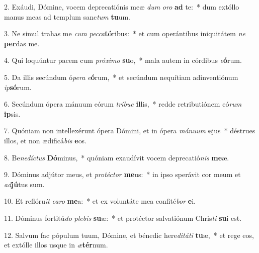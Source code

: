 2. Exáudi, Dómine, vocem deprecatiónis meæ \textit{dum} \textit{o}\textit{ro} \textbf{ad} te:~*  dum extóllo manus meas ad templum sanc\textit{tum} \textbf{tu}um.\

3. Ne simul trahas me \textit{cum} \textit{pec}\textit{ca}\textbf{tó}ribus:~*  et cum operántibus iniquitátem \textit{ne} \textbf{per}das me.\

4. Qui loquúntur pacem cum \textit{pró}\textit{xi}\textit{mo} \textbf{su}o,~*  mala autem in córdibus \textit{e}\textbf{ó}rum.\

5. Da illis secúndum ó\textit{pe}\textit{ra} \textit{e}\textbf{ó}rum,~*  et secúndum nequítiam adinventiónum \textit{ip}\textbf{só}rum.\

6. Secúndum ópera mánuum eórum \textit{trí}\textit{bu}\textit{e} \textbf{il}lis,~*  redde retributiónem eó\textit{rum} \textbf{ip}sis.\

7. Quóniam non intellexérunt ópera Dómini, et in ópera \textit{má}\textit{nu}\textit{um} \textbf{e}jus~*  déstrues illos, et non ædificá\textit{bis} \textbf{e}os.\

8. Be\textit{ne}\textit{díc}\textit{tus} \textbf{Dó}minus,~*  quóniam exaudívit vocem deprecatió\textit{nis} \textbf{me}æ.\

9. Dóminus adjútor meus, et \textit{pro}\textit{téc}\textit{tor} \textbf{me}us:~*  in ipso sperávit cor meum et \textit{ad}\textbf{jú}tus sum.\

10. Et reflóru\textit{it} \textit{ca}\textit{ro} \textbf{me}a:~*  et ex voluntáte mea confité\textit{bor} \textbf{e}i.\

11. Dóminus fortitú\textit{do} \textit{ple}\textit{bis} \textbf{su}æ:~*  et protéctor salvatiónum Chris\textit{ti} \textbf{su}i est.\

12. Salvum fac pópulum tuum, Dómine, et bénedic here\textit{di}\textit{tá}\textit{ti} \textbf{tu}æ,~*  et rege eos, et extólle illos usque in \textit{æ}\textbf{tér}num.\

